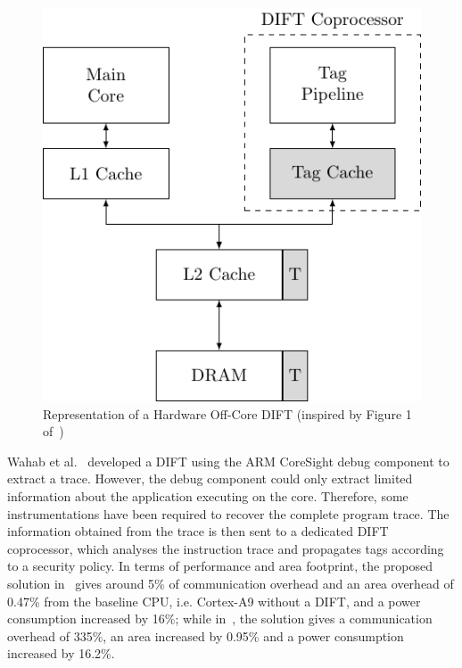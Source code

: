 \begin{figure}[ht]
    \centering
    \includegraphics{c2_soa/img/offcore.pdf}
    \caption{Representation of a Hardware Off-Core DIFT (inspired by Figure 1 of~\cite{KDK-09-dsn})}
    \label{fig:offcore_dift}
\end{figure}

Wahab et al.~\cite{WCAHLG-17-fpl, WCAHBLG-18-reconfig} developed a DIFT using the ARM CoreSight debug component to extract a trace.
However, the debug component could only extract limited information about the application executing on the core. Therefore, some instrumentations have been required to recover the complete program trace. The information obtained from the trace is then sent to a dedicated DIFT coprocessor, which analyses the instruction trace and propagates tags according to a security policy. In terms of performance and area footprint, the proposed solution in~\cite{WCAHLG-17-fpl} gives around 5\% of communication overhead and an area overhead of 0.47\% from the baseline CPU, i.e. Cortex-A9 without a DIFT, and a power consumption increased by 16\%; while in~\cite{WCAHBLG-18-reconfig}, the solution gives a communication overhead of 335\%, an area increased by 0.95\% and a power consumption increased by 16.2\%.

